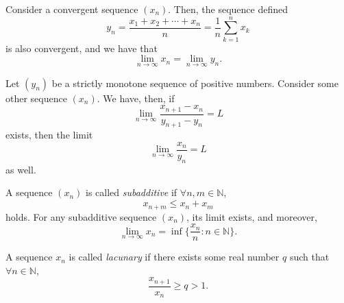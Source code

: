 \documentclass[12pt]{article}
\begin{document}
\begin{theorem}
  Consider a convergent sequence $(x_n)$. Then, the sequence defined \[y_n = \frac{x_1 + x_2 + \cdots +x_n}{n} = \frac{1}{n} \sum_{k=1}^{n} x_k\] is also convergent, and we have that \[\lim_{n\to\infty} x_n = \lim_{n\to\infty} y_n.\]
\end{theorem}
\begin{theorem}
  Let $(y_n)$ be a strictly monotone sequence of positive numbers. Consider some other sequence $(x_n)$. We have, then, if \[\lim_{n\to\infty} \frac{x_{n+1}-x_n}{y_{n+1}-y_n} = L\] exists, then the limit \[\lim_{n\to\infty} \frac{x_n}{y_n} = L\] as well.
\end{theorem}

\begin{lemma}
   A sequence $(x_n)$ is called \emph{subadditive} if $\forall n, m \in \mathbb{N}$, \[
   x_{n+m} \leq x_n + x_m 
   \]
   holds. For any subadditive sequence $(x_n)$, its limit exists, and moreover, \[
    \lim_{n\to\infty} x_n = \inf \{\frac{x_n}{n} : n \in \mathbb{N}\}.
   \]
\end{lemma}

\begin{definition}
  A sequence $x_n$ is called \emph{lacunary} if there exists some real number $q$ such that $\forall n \in \mathbb{N}$, \[
    \frac{x_{n+1}}{x_n} \geq q > 1.
  \]
\end{definition}

\end{document}

